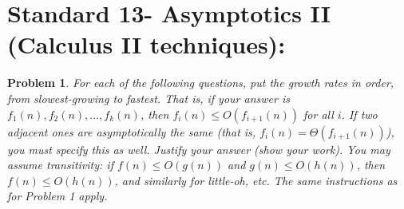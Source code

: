 \documentclass[11pt]{article}
\theoremstyle{definition}
\theoremstyle{definition}
\newtheorem{required}{Problem}
\theoremstyle{definition}
\begin{document}
\section{Standard 13- Asymptotics II (Calculus II techniques): }
\begin{required}



    {\itshape For each of the following questions, put the growth rates in order, from slowest-growing to fastest. That is, if your answer is $f_1(n), f_2(n), \dotsc, f_k(n)$, then $f_i(n) \leq O(f_{i+1}(n))$ for all $i$. If two adjacent ones are asymptotically the same (that is, $f_i(n) = \Theta(f_{i+1}(n))$), you must specify this as well. 
    Justify your answer (show your work). You may assume transitivity: if $f(n) \leq O(g(n))$ and $g(n) \leq O(h(n))$, then $f(n) \leq O(h(n))$, and similarly for little-oh, etc. The same instructions as for Problem 1 apply.}
    \begin{enumerate}[label=(\alph*)]

\end{enumerate}
\end{required}
\end{document}
